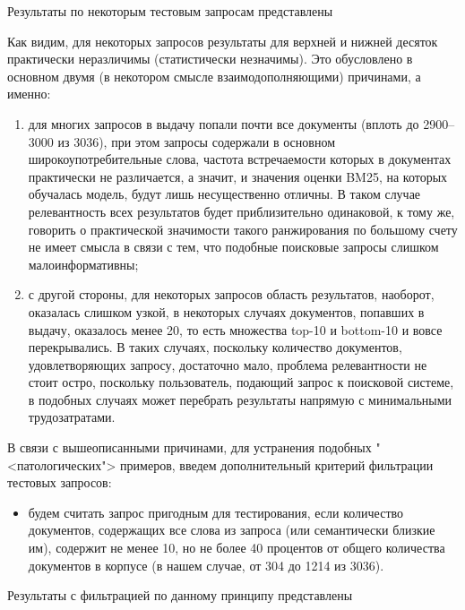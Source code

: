 Результаты по некоторым тестовым запросам представлены %

Как видим, для некоторых запросов результаты для верхней и нижней десяток практически неразличимы (статистически незначимы).
Это обусловлено в основном двумя (в некотором смысле взаимодополняющими) причинами, а именно:
\begin{enumerate}[1)]
    \item для многих запросов в выдачу попали почти все документы (вплоть до 2900--3000 из 3036), при этом запросы содержали в основном 
          широкоупотребительные слова, частота встречаемости которых в документах практически не различается, а значит, и значения оценки BM25,
          на которых обучалась модель, будут лишь несущественно отличны. В таком случае релевантность всех результатов будет приблизительно 
          одинаковой, к тому же, говорить о практической значимости такого ранжирования по большому счету не имеет смысла в связи с тем,
          что подобные поисковые запросы слишком малоинформативны;
    \item с другой стороны, для некоторых запросов область результатов, наоборот, оказалась слишком узкой, в некоторых случаях документов,
          попавших в выдачу, оказалось менее 20, то есть множества top-10 и bottom-10 и вовсе перекрывались. В таких случаях, поскольку
          количество документов, удовлетворяющих запросу, достаточно мало, проблема релевантности не стоит остро, поскольку пользователь,
          подающий запрос к поисковой системе, в подобных случаях может перебрать результаты напрямую с минимальными трудозатратами.
\end{enumerate}

В связи с вышеописанными причинами, для устранения подобных "<патологических"> примеров, введем дополнительный критерий фильтрации тестовых
запросов:
\begin{itemize}
    \item будем считать запрос пригодным для тестирования, если количество документов, содержащих все слова из запроса (или семантически
          близкие им), содержит не менее 10, но не более 40 процентов от общего количества документов в корпусе (в нашем случае, от 304 до 1214
          из 3036).
\end{itemize}

Результаты с фильтрацией по данному принципу представлены %
